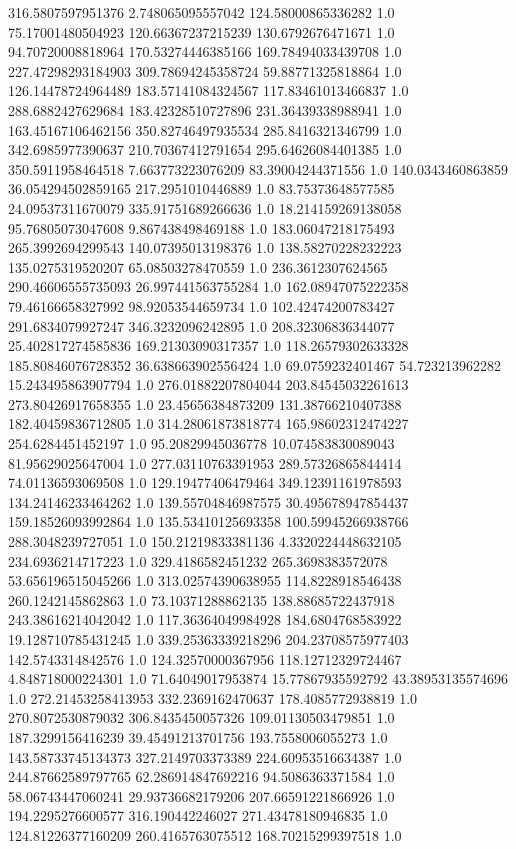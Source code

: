 316.5807597951376	2.748065095557042	124.58000865336282	1.0
75.17001480504923	120.66367237215239	130.6792676471671	1.0
94.70720008818964	170.53274446385166	169.78494033439708	1.0
227.47298293184903	309.78694245358724	59.88771325818864	1.0
126.14478724964489	183.57141084324567	117.83461013466837	1.0
288.6882427629684	183.42328510727896	231.36439338988941	1.0
163.45167106462156	350.82746497935534	285.8416321346799	1.0
342.6985977390637	210.70367412791654	295.64626084401385	1.0
350.5911958464518	7.663773223076209	83.39004244371556	1.0
140.0343460863859	36.054294502859165	217.2951010446889	1.0
83.75373648577585	24.09537311670079	335.91751689266636	1.0
18.214159269138058	95.76805073047608	9.867438498469188	1.0
183.06047218175493	265.3992694299543	140.07395013198376	1.0
138.58270228232223	135.0275319520207	65.08503278470559	1.0
236.3612307624565	290.46606555735093	26.997441563755284	1.0
162.08947075222358	79.46166658327992	98.92053544659734	1.0
102.42474200783427	291.6834079927247	346.3232096242895	1.0
208.32306836344077	25.402817274585836	169.21303090317357	1.0
118.26579302633328	185.80846076728352	36.638663902556424	1.0
69.0759232401467	54.723213962282	15.243495863907794	1.0
276.01882207804044	203.84545032261613	273.80426917658355	1.0
23.45656384873209	131.38766210407388	182.40459836712805	1.0
314.28061873818774	165.98602312474227	254.6284451452197	1.0
95.20829945036778	10.074583830089043	81.95629025647004	1.0
277.03110763391953	289.57326865844414	74.01136593069508	1.0
129.19477406479464	349.12391161978593	134.24146233464262	1.0
139.55704846987575	30.495678947854437	159.18526093992864	1.0
135.53410125693358	100.59945266938766	288.3048239727051	1.0
150.21219833381136	4.3320224448632105	234.6936214717223	1.0
329.4186582451232	265.3698383572078	53.656196515045266	1.0
313.02574390638955	114.8228918546438	260.1242145862863	1.0
73.10371288862135	138.88685722437918	243.38616214042042	1.0
117.36364049984928	184.6804768583922	19.128710785431245	1.0
339.25363339218296	204.23708575977403	142.5743314842576	1.0
124.32570000367956	118.12712329724467	4.848718000224301	1.0
71.64049017953874	15.77867935592792	43.38953135574696	1.0
272.21453258413953	332.2369162470637	178.4085772938819	1.0
270.8072530879032	306.8435450057326	109.01130503479851	1.0
187.3299156416239	39.45491213701756	193.7558006055273	1.0
143.58733745134373	327.2149703373389	224.60953516634387	1.0
244.87662589797765	62.286914847692216	94.5086363371584	1.0
58.06743447060241	29.93736682179206	207.66591221866926	1.0
194.2295276600577	316.190442246027	271.43478180946835	1.0
124.81226377160209	260.4165763075512	168.70215299397518	1.0
